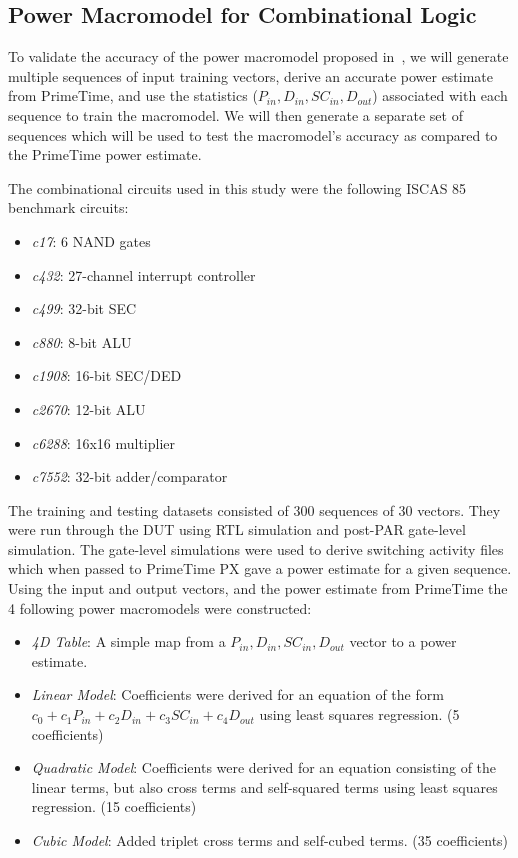 \subsection{Power Macromodel for Combinational Logic}
To validate the accuracy of the power macromodel proposed in~\cite{Najm2000_2}, we will generate multiple sequences of input training vectors, derive an accurate power estimate from PrimeTime, and use the statistics ($P_{in}, D_{in}, SC_{in}, D_{out}$) associated with each sequence to train the macromodel. We will then generate a separate set of sequences which will be used to test the macromodel's accuracy as compared to the PrimeTime power estimate.

The combinational circuits used in this study were the following ISCAS 85 benchmark circuits:

\begin{itemize}
	\item \textit{c17}: 6 NAND gates
	\item \textit{c432}: 27-channel interrupt controller
	\item \textit{c499}: 32-bit SEC
	\item \textit{c880}: 8-bit ALU
	\item \textit{c1908}: 16-bit SEC/DED
	\item \textit{c2670}: 12-bit ALU
	\item \textit{c6288}: 16x16 multiplier
	\item \textit{c7552}: 32-bit adder/comparator 
\end{itemize}

The training and testing datasets consisted of 300 sequences of 30 vectors. They were run through the DUT using RTL simulation and post-PAR gate-level simulation. The gate-level simulations were used to derive switching activity files which when passed to PrimeTime PX gave a power estimate for a given sequence. Using the input and output vectors, and the power estimate from PrimeTime the 4 following power macromodels were constructed:

\begin{itemize}
	\item \textit{4D Table}: A simple map from a $P_{in}, D_{in}, SC_{in}, D_{out}$ vector to a power estimate.
	\item \textit{Linear Model}: Coefficients were derived for an equation of the form $c_0 + c_1 P_{in} + c_2 D_{in} + c_3 SC_{in} + c_4 D_{out}$ using least squares regression. (5 coefficients)
	\item \textit{Quadratic Model}: Coefficients were derived for an equation consisting of the linear terms, but also cross terms and self-squared terms using least squares regression. (15 coefficients)
	\item \textit{Cubic Model}: Added triplet cross terms and self-cubed terms. (35 coefficients)
\end{itemize}

